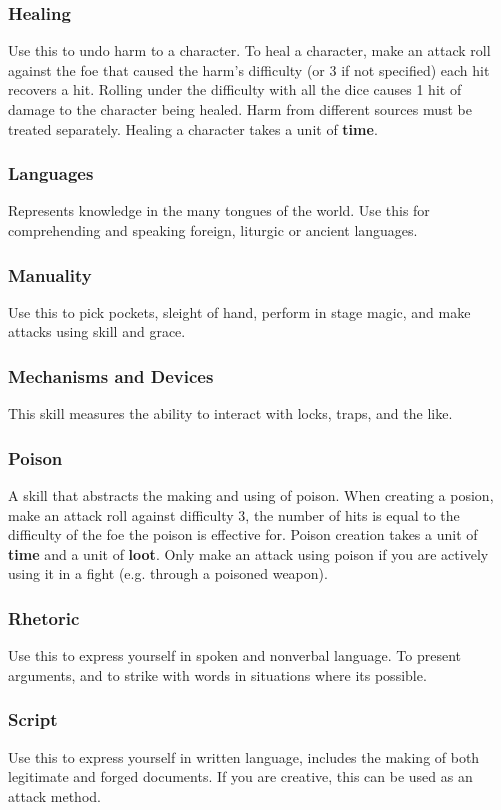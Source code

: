 \begin{multicols}{2}
\subsubsection*{Healing}
Use this to undo harm to a character. To heal a character, make an attack roll against the foe that caused the harm's difficulty (or 3 if not specified) each hit recovers a hit. Rolling under the difficulty with all the dice causes 1 hit of damage to the character being healed. Harm from different sources must be treated separately. Healing a character takes a unit of \textbf{time}.
\subsubsection*{Languages}
Represents knowledge in the many tongues of the world. Use this for comprehending and speaking foreign, liturgic or ancient languages.
\subsubsection*{Manuality}
Use this to pick pockets, sleight of hand, perform in stage magic, and make attacks using skill and grace.
\subsubsection*{Mechanisms and Devices}
This skill measures the ability to interact with locks, traps, and the like.
\subsubsection*{Poison}
A skill that abstracts the making and using of poison. When creating a posion, make an attack roll against difficulty 3, the number of hits is equal to the difficulty of the foe the poison is effective for. Poison creation takes a unit of \textbf{time} and a unit of \textbf{loot}. Only make an attack using poison if you are actively using it in a fight (e.g. through a poisoned weapon).
\subsubsection*{Rhetoric}
Use this to express yourself in spoken and nonverbal language. To present arguments, and to strike with words in situations where its possible.
\subsubsection*{Script}
Use this to express yourself in written language, includes the making of both legitimate and forged documents. If you are creative, this can be used as an attack method.

\end{multicols}
